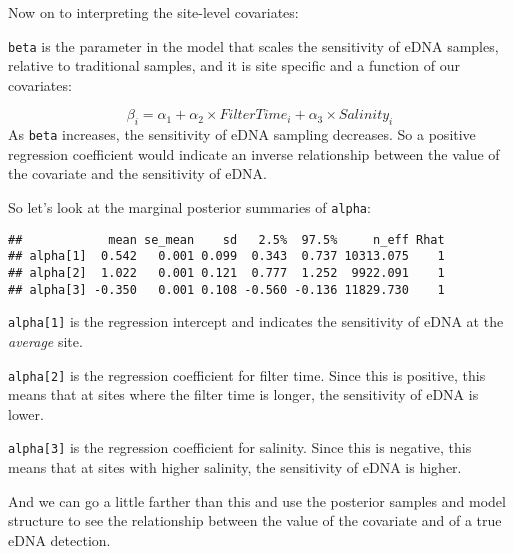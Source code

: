 \documentclass[
]{article}
\newenvironment{Shaded}{\begin{snugshade}}{\end{snugshade}}
\newcommand{\AttributeTok}[1]{\textcolor[rgb]{0.13,0.29,0.53}{#1}}
\newcommand{\FunctionTok}[1]{\textcolor[rgb]{0.13,0.29,0.53}{\textbf{#1}}}
\newcommand{\NormalTok}[1]{#1}
\newcommand{\SpecialCharTok}[1]{\textcolor[rgb]{0.81,0.36,0.00}{\textbf{#1}}}
\newcommand{\StringTok}[1]{\textcolor[rgb]{0.31,0.60,0.02}{#1}}
\begin{document}
Now on to interpreting the site-level covariates:

\texttt{beta} is the parameter in the model that scales the sensitivity
of eDNA samples, relative to traditional samples, and it is site
specific and a function of our covariates:

\[
\beta_i = \alpha_1 + \alpha_2 \times FilterTime_i + \alpha_3 \times Salinity_i
\] As \texttt{beta} increases, the sensitivity of eDNA sampling
decreases. So a positive regression coefficient would indicate an
inverse relationship between the value of the covariate and the
sensitivity of eDNA.

So let's look at the marginal posterior summaries of \texttt{alpha}:

\begin{Shaded}
\end{Shaded}

\begin{verbatim}
##            mean se_mean    sd   2.5%  97.5%     n_eff Rhat
## alpha[1]  0.542   0.001 0.099  0.343  0.737 10313.075    1
## alpha[2]  1.022   0.001 0.121  0.777  1.252  9922.091    1
## alpha[3] -0.350   0.001 0.108 -0.560 -0.136 11829.730    1
\end{verbatim}

\texttt{alpha{[}1{]}} is the regression intercept and indicates the
sensitivity of eDNA at the \emph{average} site.

\texttt{alpha{[}2{]}} is the regression coefficient for filter time.
Since this is positive, this means that at sites where the filter time
is longer, the sensitivity of eDNA is lower.

\texttt{alpha{[}3{]}} is the regression coefficient for salinity. Since
this is negative, this means that at sites with higher salinity, the
sensitivity of eDNA is higher.

And we can go a little farther than this and use the posterior samples
and model structure to see the relationship between the value of the
covariate and of a true eDNA detection.
\end{document}
